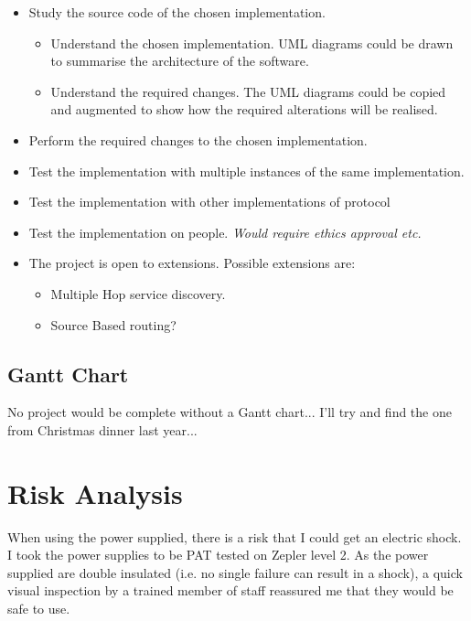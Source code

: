 \documentclass[12pt]{report}
\begin{document}
\begin{itemize}

\item Study the source code of the chosen implementation.

\begin{itemize}

\item Understand the chosen implementation.
UML diagrams could be drawn to summarise the architecture of the software. 

\item Understand the required changes.
The UML diagrams could be copied and augmented to show how the required
alterations will be realised. 

\end{itemize}

\item Perform the required changes to the chosen implementation.
\item Test the implementation with multiple instances of the same implementation.
\item Test the implementation with other implementations of protocol 
\item Test the implementation on people. \em Would require ethics approval etc. \em
{}
\item The project is open to extensions. Possible extensions are:

\begin{itemize}
\item Multiple Hop service discovery.
\item Source Based routing?
\end{itemize}

\end{itemize}

\section{Gantt Chart}
No project would be complete without a Gantt chart... I'll try and find the one
from Christmas dinner last year...


\chapter{Risk Analysis}

When using the power supplied, there is a risk that I could get an electric
shock. I took the power supplies to be PAT tested on Zepler level 2. As the
power supplied are double insulated (i.e. no single failure can result in a
shock), a quick visual inspection by a trained member of staff reassured me that
they would be safe to use. 
\end{document}
